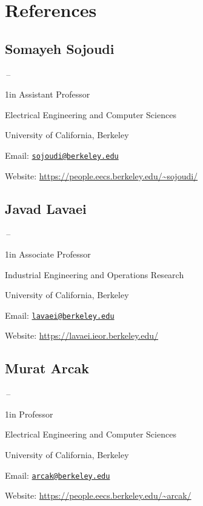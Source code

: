 \documentclass[11pt]{article}
\newcommand{\sectionwidth}{1in}		%
\newcommand{\subsectionskip}{\baselineskip}	%
\newcommand{\cvdates}[2]{\hfill#1\,--\,#2}	%
\begin{document}
	\section{References}

	\subsection{Somayeh Sojoudi}
	\cvdates{}{}

	\begin{adjustwidth}{\sectionwidth}{}
	Assistant Professor

	Electrical Engineering and Computer Sciences

	University of California, Berkeley
	
	Email: \href{mailto:sojoudi@berkeley.edu}{\texttt{sojoudi@berkeley.edu}}

	Website: \url{https://people.eecs.berkeley.edu/~sojoudi/}
	\end{adjustwidth}

	\vspace*{\subsectionskip}

	\subsection{Javad Lavaei}
	\cvdates{}{}

	\begin{adjustwidth}{\sectionwidth}{}
	Associate Professor

	Industrial Engineering and Operations Research

	University of California, Berkeley

	Email: \href{mailto:lavaei@berkeley.edu}{\texttt{lavaei@berkeley.edu}}

	Website: \url{https://lavaei.ieor.berkeley.edu/}
	\end{adjustwidth}
	
	\vspace*{\subsectionskip}

	\subsection{Murat Arcak}
	\cvdates{}{}

	\begin{adjustwidth}{\sectionwidth}{}
	Professor

	Electrical Engineering and Computer Sciences

	University of California, Berkeley

	Email: \href{mailto:arcak@berkeley.edu}{\texttt{arcak@berkeley.edu}}

	Website: \url{https://people.eecs.berkeley.edu/~arcak/}
	\end{adjustwidth}
\end{document}

